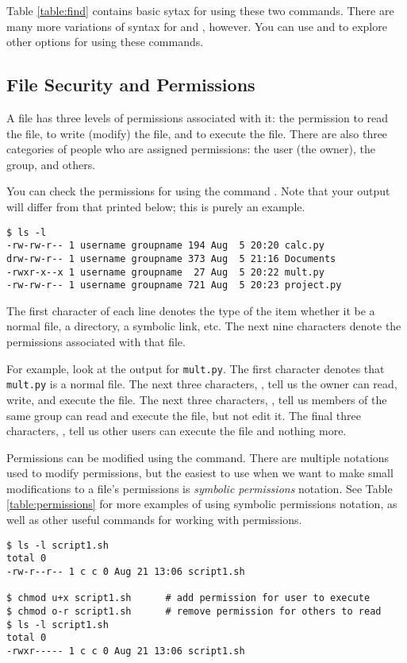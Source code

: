 Table \ref{table:find} contains basic sytax for using these two commands. 
There are many more variations of syntax for  and , however.
You can use  and  to explore other options for using these commands. 


\subsection*{File Security and Permissions}%
A file has three levels of permissions associated with it: the permission to read the file, to write (modify) the file, and to execute the file.
There are also three categories of people who are assigned permissions: the user (the owner), the group, and others.

You can check the permissions for  using the command .
Note that your output will differ from that printed below; this is purely an example.

\begin{lstlisting}
$ ls -l
-rw-rw-r-- 1 username groupname 194 Aug  5 20:20 calc.py
drw-rw-r-- 1 username groupname 373 Aug  5 21:16 Documents
-rwxr-x--x 1 username groupname  27 Aug  5 20:22 mult.py
-rw-rw-r-- 1 username groupname 721 Aug  5 20:23 project.py
\end{lstlisting}

The first character of each line denotes the type of the item whether it be a normal file, a directory, a symbolic link, etc.
The next nine characters denote the permissions associated with that file.

For example, look at the output for \texttt{mult.py}.
The first character \li{-} denotes that \texttt{mult.py} is a normal file.
The next three characters, , tell us the owner can read, write, and execute the file.
The next three characters, , tell us members of the same group can read and execute the file, but not edit it.
The final three characters, , tell us other users can execute the file and nothing more.

Permissions can be modified using the  command.
There are multiple notations used to modify permissions, but the easiest to use when we want to make small modifications to a file's permissions is \emph{symbolic permissions} notation.
See Table \ref{table:permissions} for more examples of using symbolic permissions notation, as well as other useful commands for working with permissions.
\begin{lstlisting}
$ ls -l script1.sh
total 0
-rw-r--r-- 1 c c 0 Aug 21 13:06 script1.sh  

$ chmod u+x script1.sh      # add permission for user to execute
$ chmod o-r script1.sh 		# remove permission for others to read
$ ls -l script1.sh
total 0
-rwxr----- 1 c c 0 Aug 21 13:06 script1.sh
\end{lstlisting}

